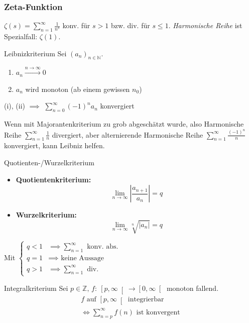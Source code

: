 \documentclass[a4paper,10pt]{article}
\def\limn{\lim_{n\to \infty}}
\def\sumn{\sum_{n=0}^\infty}
\def\N{\mathbb{N}}
\def\Z{\mathbb{Z}}
\begin{document}
\subsubsection{Zeta-Funktion}
$\zeta(s) = \sum_{n=1}^\infty \frac{1}{n^s}$ konv. für $s > 1$ bzw. div. für $s \le 1$.
\emph{Harmonische Reihe} ist Spezialfall: $\zeta(1)$.

\begin{mainbox}{Leibnizkriterium}
Sei $(a_n)_{n \in \N}$.
\renewcommand{\labelenumi}{(\roman{enumi})}
\begin{enumerate}
    \item $a_n \xrightarrow{n \to \infty} 0$
    \item $a_n$ wird monoton (ab einem gewissen $n_0$)
\end{enumerate}
(i), (ii) $\implies$ $\sumn{(-1)^n a_n}$ konvergiert
\end{mainbox}
Wenn mit Majorantenkriterium zu grob abgeschätzt wurde, also Harmonische Reihe $\sum_{n=1}^\infty \frac{1}{n}$ divergiert, aber alternierende Harmonische Reihe $\sum_{n=1}^\infty \frac{(-1)^n}{n}$ konvergiert, kann Leibniz helfen.

\begin{mainbox}{Quotienten-/Wurzelkriterium}
\begin{itemize}
    \item \textbf{Quotientenkriterium:} \[ \limn{\left| \frac{a_{n+1}}{a_n} \right|} = q \]
    \item \textbf{Wurzelkriterium:} \[ \limn{\sqrt[n]{\left| a_n \right|}} = q \]
\end{itemize}
Mit \(
\begin{cases}
    q < 1 &\implies \sum_{n=1}^\infty \text{ konv. abs.} \\
    q = 1 &\implies \text{ keine Aussage} \\
    q > 1 &\implies \sum_{n=1}^\infty \text{ div.}
\end{cases}
\)
\end{mainbox}

\begin{subbox}{Integralkriterium}
Sei $p \in \Z, \, f: \: \left[ p, \infty \right[ \to \left[ 0, \infty \right[$ monoton fallend.
\begin{multline*}
    f \text{ auf } \left[p, \infty \right[ \text{ integrierbar} \\
    \iff \sum_{n=p}^\infty f(n) \text{ ist konvergent}
\end{multline*}
\end{subbox}
\end{document}
